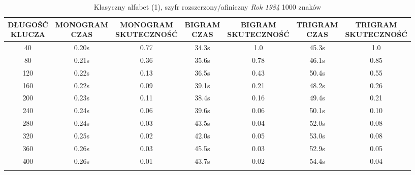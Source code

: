 \documentclass[a4paper]{article}
\theoremstyle{defn}
\theoremstyle{theorem}
\theoremstyle{lemma}
\theoremstyle{cor}
\theoremstyle{fact}
\begin{document}
\begin{center}\begin{small}\begin{longtable}{|c|c|c|c|c|c|c|} 
\hline \makecell{DŁUGOŚĆ\\KLUCZA} &  \makecell{MONOGRAM\\CZAS} & \makecell{MONOGRAM\\SKUTECZNOŚĆ} & \makecell{BIGRAM\\CZAS} &  \makecell{BIGRAM\\SKUTECZNOŚĆ} & \makecell{TRIGRAM\\CZAS} & \makecell{TRIGRAM\\SKUTECZNOŚĆ}\\ \hline 
40 & 0.20s & 0.77 & 34.3s & 1.0 & 45.3s & 1.0 \\ \hline 
80 & 0.21s & 0.36 & 35.6s & 0.78 & 46.1s & 0.85 \\ \hline 
120 & 0.22s & 0.13 & 36.5s & 0.43 & 50.4s & 0.55 \\ \hline 
160 & 0.22s & 0.09 & 39.1s & 0.21 & 48.2s & 0.26 \\ \hline 
200 & 0.23s & 0.11 & 38.4s & 0.16 & 49.4s & 0.21 \\ \hline 
240 & 0.24s & 0.06 & 39.6s & 0.06 & 50.1s & 0.10 \\ \hline 
280 & 0.24s & 0.03 & 43.5s & 0.04 & 52.0s & 0.08 \\ \hline 
320 & 0.25s & 0.02 & 42.0s & 0.05 & 53.0s & 0.08 \\ \hline 
360 & 0.26s & 0.03 & 45.5s & 0.03 & 52.9s & 0.05 \\ \hline 
400 & 0.26s & 0.01 & 43.7s & 0.02 & 54.4s & 0.04 \\ \hline 
\caption{Klasyczny alfabet (1), szyfr rozszerzony/afiniczny \textit{Rok 1984} 1000 znaków}
\end{longtable}\end{small}\end{center} 
\end{document}

